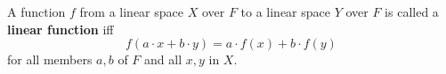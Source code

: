A function $f$ from a linear space $X$ over $F$ to a linear space $Y$ over $F$ is called a \textbf{linear function} iff
$$f(a \cdot x + b \cdot y) = a \cdot f(x) + b \cdot f(y)$$
for all members $a, b$ of $F$ and all $x, y$ in $X$.
